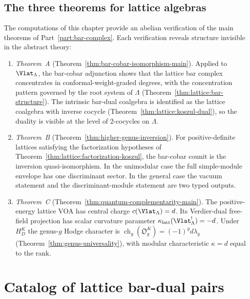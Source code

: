 \subsection{The three theorems for lattice algebras}

\begin{remark}
\label{rem:lattice-three-theorems}
The computations of this chapter provide an abelian verification of the
main theorems of Part~\ref{part:bar-complex}. Each verification reveals structure invisible
in the abstract theory:

\begin{enumerate}
\item \emph{Theorem~A} (Theorem~\ref{thm:bar-cobar-isomorphism-main}).
 Applied to $\Vlat_\Lambda$, the bar-cobar adjunction shows
 that the lattice bar complex concentrates in
 conformal-weight-graded degrees, with the concentration pattern
 governed by the root system of $\Lambda$
 (Theorem~\ref{thm:lattice:bar-structure}). The intrinsic
 bar-dual coalgebra is identified as the lattice coalgebra with
 inverse cocycle (Theorem~\ref{thm:lattice:koszul-dual}), so the
 duality is visible at the level of 2-cocycles on $\Lambda$.

\item \emph{Theorem~B} (Theorem~\ref{thm:higher-genus-inversion}).
 For positive-definite lattices satisfying the factorization
 hypotheses of Theorem~\ref{thm:lattice:factorization-koszul}, the
 bar-cobar counit is the inversion quasi-isomorphism.  In the
 unimodular case the full simple-module envelope has one discriminant
 sector.  In the general case the vacuum statement and the
 discriminant-module statement are two typed outputs.

\item \emph{Theorem~C}
 (Theorem~\ref{thm:quantum-complementarity-main}).
 The positive-energy lattice VOA has central charge
 $c(\Vlat_\Lambda)=d$.  Its Verdier-dual free-field projection has
 scalar curvature parameter
 $\kappa_{\mathrm{latt}}(\Vlat_\Lambda^!)=-d$.
 Under~$H_D^K$ the genus-$g$ Hodge character is
 $\operatorname{ch}_g(\mathfrak O_g^K)=(-1)^gd\lambda_g$
 (Theorem~\ref{thm:genus-universality}), with modular
 characteristic $\kappa=d$ equal to the rank.
\end{enumerate}
\end{remark}

\section{Catalog of lattice bar-dual pairs}\label{sec:lattice:catalog}

